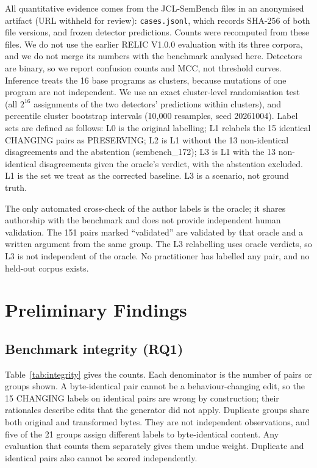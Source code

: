 \documentclass[conference]{IEEEtran}
\begin{document}
All quantitative evidence comes from the JCL-SemBench files in an anonymised artifact (URL withheld for review): \texttt{cases.jsonl}, which records SHA-256 of both file versions, and frozen detector predictions. Counts were recomputed from these files. We do not use the earlier RELIC V1.0.0 evaluation with its three corpora, and we do not merge its numbers with the benchmark analysed here. Detectors are binary, so we report confusion counts and MCC, not threshold curves. Inference treats the 16 base programs as clusters, because mutations of one program are not independent. We use an exact cluster-level randomisation test (all $2^{16}$ assignments of the two detectors' predictions within clusters), and percentile cluster bootstrap intervals (10{,}000 resamples, seed 20261004). Label sets are defined as follows: L0 is the original labelling; L1 relabels the 15 identical CHANGING pairs as PRESERVING; L2 is L1 without the 13 non-identical disagreements and the abstention (sembench\_172); L3 is L1 with the 13 non-identical disagreements given the oracle's verdict, with the abstention excluded. L1 is the set we treat as the corrected baseline. L3 is a scenario, not ground truth.

The only automated cross-check of the author labels is the oracle; it shares authorship with the benchmark and does not provide independent human validation. The 151 pairs marked ``validated'' are validated by that oracle and a written argument from the same group. The L3 relabelling uses oracle verdicts, so L3 is not independent of the oracle. No practitioner has labelled any pair, and no held-out corpus exists.

\section{Preliminary Findings}
\subsection{Benchmark integrity (RQ1)}
Table~\ref{tab:integrity} gives the counts. Each denominator is the number of pairs or groups shown. A byte-identical pair cannot be a behaviour-changing edit, so the 15 CHANGING labels on identical pairs are wrong by construction; their rationales describe edits that the generator did not apply. Duplicate groups share both original and transformed bytes. They are not independent observations, and five of the 21 groups assign different labels to byte-identical content. Any evaluation that counts them separately gives them undue weight. Duplicate and identical pairs also cannot be scored independently.
\end{document}
